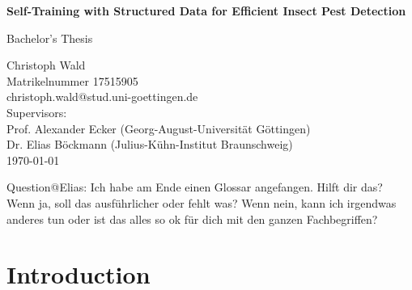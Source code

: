 \documentclass[12pt,a4paper]{article}
\begin{document}
\begin{titlepage}
 \vspace*{\fill}
    \centering
    {\Huge\bfseries Self-Training with Structured Data for Efficient Insect Pest Detection\par}
    \vspace{1cm}
{\LARGE Bachelor’s Thesis\par}
    \vspace{1cm}
    
    \centering
    {\large
    Christoph Wald\\
    Matrikelnummer 17515905\\
    christoph.wald@stud.uni-goettingen.de\\
    \vspace{1\baselineskip}
    Supervisors: \\
    Prof. Alexander Ecker (Georg-August-Universität Göttingen)\\
    Dr. Elias Böckmann (Julius-Kühn-Institut Braunschweig)\\
    \vspace{1\baselineskip}
    {\today}\\
    }

     \vspace*{\fill}
\end{titlepage}

\newpage

\tableofcontents

{\color{red} Question@Elias: Ich habe am Ende einen Glossar angefangen. Hilft dir das? Wenn ja, soll das ausführlicher oder fehlt was? Wenn nein, kann ich irgendwas anderes tun oder ist das alles so ok für dich mit den ganzen Fachbegriffen?}

\section{Introduction}
\end{document}
